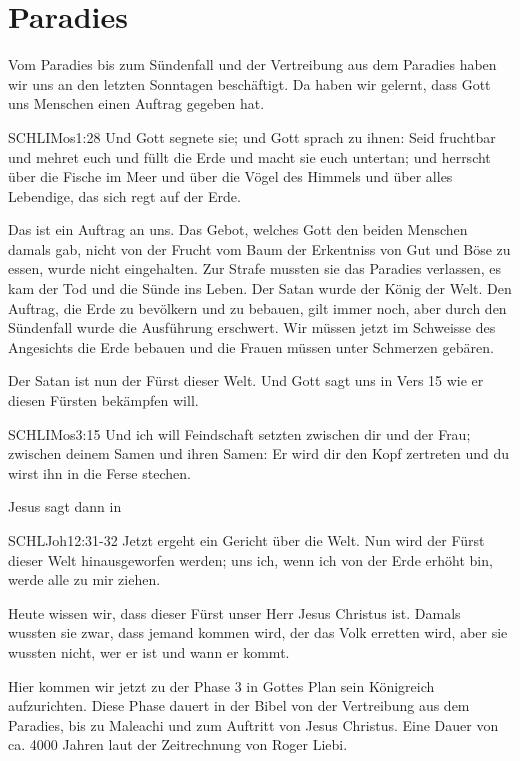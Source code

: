 \section{Paradies}
        Vom Paradies bis zum Sündenfall und der Vertreibung aus dem Paradies haben wir uns an den letzten Sonntagen beschäftigt. Da haben wir gelernt, dass Gott uns Menschen einen Auftrag gegeben hat.
        \begin{bibelquote}{SCHL}{IMos}{1:28}
            Und Gott segnete sie; und Gott sprach zu ihnen: Seid fruchtbar und mehret euch und füllt die Erde und macht sie euch untertan; und herrscht über die Fische im Meer und über die Vögel des Himmels und über alles Lebendige, das sich regt auf der Erde.
        \end{bibelquote}
        Das ist ein Auftrag an uns. Das Gebot, welches Gott den beiden Menschen damals gab, nicht von der Frucht vom Baum der Erkentniss von Gut und Böse zu essen, wurde nicht eingehalten. Zur Strafe mussten sie das Paradies verlassen, es kam der Tod und die Sünde ins Leben. Der Satan wurde der König der Welt. Den Auftrag, die Erde zu bevölkern und zu bebauen, gilt immer noch, aber durch den Sündenfall wurde die Ausführung erschwert. Wir müssen jetzt im Schweisse des Angesichts die Erde bebauen und die Frauen müssen unter Schmerzen gebären.
        
        Der Satan ist nun der Fürst dieser Welt. Und Gott sagt uns in Vers 15 wie er diesen Fürsten bekämpfen will.
        \begin{bibelquote}{SCHL}{IMos}{3:15}
            Und ich will Feindschaft setzten zwischen dir und der Frau; zwischen deinem Samen und ihren Samen: Er wird dir den Kopf zertreten und du wirst ihn in die Ferse stechen.
        \end{bibelquote}
        Jesus sagt dann in 
        \begin{bibelquote}{SCHL}{Joh}{12:31-32}
            Jetzt ergeht ein Gericht über die Welt. Nun wird der Fürst dieser Welt hinausgeworfen werden; uns ich, wenn ich von der Erde erhöht bin, werde alle zu mir ziehen.
        \end{bibelquote}
        Heute wissen wir, dass dieser Fürst unser Herr Jesus Christus ist. Damals wussten sie zwar, dass jemand kommen wird, der das Volk erretten wird, aber sie wussten nicht, wer er ist und wann er kommt.
        
        Hier kommen wir jetzt zu der Phase 3 in Gottes Plan sein Königreich aufzurichten. Diese Phase dauert in der Bibel von der Vertreibung aus dem Paradies, bis zu Maleachi und zum Auftritt von Jesus Christus. Eine Dauer von ca. 4000 Jahren laut der Zeitrechnung von Roger Liebi.

